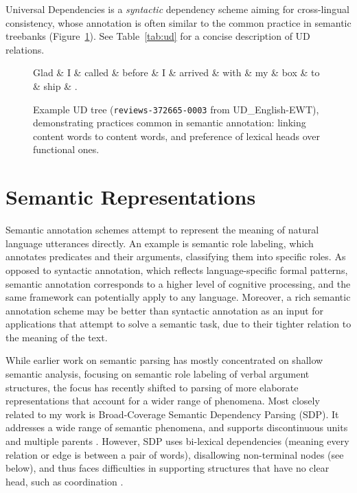 \documentclass[12pt,a4paper,table]{report}
\begin{document}
Universal Dependencies \citep{nivre2016universal}
is a \textit{syntactic} dependency scheme aiming for cross-lingual consistency,
whose annotation is often similar to the common practice in semantic treebanks
(Figure~\ref{fig:original_example_ud}).
See Table~\ref{tab:ud} for a concise description of UD relations.

\begin{figure}[t]
  \centering
    \begin{dependency}[text only label, label style={above,font=\tt}, font=\small]
    \begin{deptext}[column sep=.8em]
    Glad \& I    \& called \& before \& I    \& arrived \& with \& my   \& box  \& to   \& ship \& . \\
    \end{deptext}
    \end{dependency}
\caption{Example UD tree (\texttt{reviews-372665-0003} from UD\_English-EWT), demonstrating practices common in semantic annotation:
linking content words to content words, and preference of lexical heads over functional ones.
\label{fig:original_example_ud}}
\end{figure}

\section{Semantic Representations}

Semantic annotation schemes attempt to represent the meaning of natural
language utterances directly. An example is semantic role
labeling, which annotates
predicates and their arguments, classifying them into specific roles. As
opposed to syntactic annotation, which reflects language-specific formal
patterns, semantic annotation corresponds to a higher level of cognitive
processing, and the same framework can potentially apply to any language.
Moreover, a rich semantic annotation scheme may be better than
syntactic annotation as an input for applications that attempt to solve a
semantic task, due to their tighter relation to the meaning of the text.

While earlier work on semantic parsing has mostly concentrated on shallow semantic analysis,
focusing on semantic role labeling of verbal argument structures,
the focus has recently shifted to parsing of more elaborate representations that account
for a wider range of phenomena. 
Most closely related to my work is Broad-Coverage Semantic Dependency Parsing (SDP).
It addresses a wide range of semantic phenomena,
and supports discontinuous units and multiple parents \citep{oepen2016towards}.
However, SDP uses bi-lexical dependencies
(meaning every relation or edge is between a pair of words),
disallowing non-terminal nodes (see below),
and thus faces difficulties in supporting
structures that have no clear head, such as coordination \citep{Ivanova2012who}.
\end{document}
